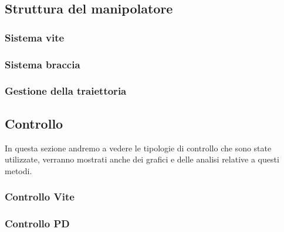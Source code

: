 \subsection{Struttura del manipolatore}
\subsubsection{Sistema vite}
\subsubsection{Sistema braccia}
\subsubsection{Gestione della traiettoria}
\subsection{Controllo}
In questa sezione andremo a vedere le tipologie di controllo che sono state utilizzate, verranno mostrati anche dei grafici e delle analisi relative a questi metodi.
\subsubsection{Controllo Vite}
\subsubsection{Controllo PD}
